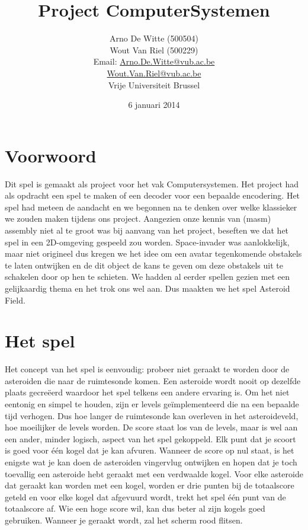 \documentclass{article}
\title{Project ComputerSystemen}
\author{Arno De Witte (500504) \\Wout Van Riel (500229)  \\Email: \href{mailto:Arno.De.Witte@vub.ac.be}{Arno.De.Witte@vub.ac.be} \\ \href{mailto:Wout.Van.Riel@vub.ac.be}{Wout.Van.Riel@vub.ac.be} \\ 
Vrije Universiteit Brussel}
\date{6 januari 2014}
\begin{document}
\maketitle
\newpage
\tableofcontents
\newpage


\section{Voorwoord}
Dit spel is gemaakt als project voor het vak Computersystemen.
Het project had als opdracht een spel te maken of een decoder voor een bepaalde encodering.
Het spel had meteen de aandacht en we begonnen na te denken over welke klassieker we zouden maken tijdens ons project.
Aangezien onze kennis van (masm) assembly niet al te groot was bij aanvang van het project, beseften we dat het spel in een 2D-omgeving gespeeld zou worden.
Space-invader was aanlokkelijk, maar niet origineel dus kregen we het idee om een avatar tegenkomende obstakels te laten ontwijken en de dit object de kans te geven om deze obstakels uit te schakelen door op hen te schieten.
We hadden al eerder spellen gezien met een gelijkaardig thema en het trok ons wel aan. Dus maakten we het spel Asteroid Field.

\section{Het spel}\label{spel}

Het concept van het spel is eenvoudig: probeer niet geraakt te worden door de asteroiden die naar de ruimtesonde komen.
Een asteroide wordt nooit op dezelfde plaats gecreëerd waardoor het spel telkens een andere ervaring is.
Om het niet eentonig en simpel te houden, zijn er levels ge\"implementeerd die na een bepaalde tijd verhogen.
Dus hoe langer de ruimtesonde kan overleven in het asteroideveld, hoe moeilijker de levels worden.
De score staat los van de levels, maar is wel aan een ander, minder logisch, aspect van het spel gekoppeld.
Elk punt dat je scoort is goed voor \'e\'en kogel dat je kan afvuren.
Wanneer de score op nul staat, is het enigste wat je kan doen de asteroiden vingervlug ontwijken en hopen dat je toch toevallig een asteroide hebt geraakt met een verdwaalde kogel.
Voor elke asteroide dat geraakt kan worden met een kogel, worden er drie punten bij de totaalscore geteld en voor elke kogel dat afgevuurd wordt, trekt het spel \'e\'en punt van de totaalscore af.
Wie een hoge score wil, kan dus beter al zijn kogels goed gebruiken.
Wanneer je geraakt wordt, zal het scherm rood flitsen.
\end{document}
